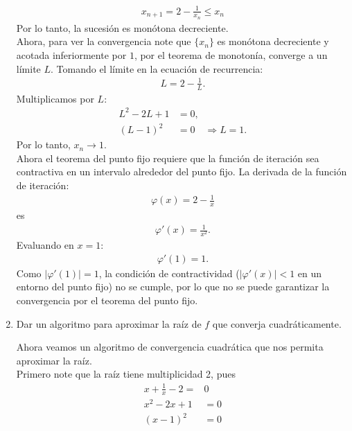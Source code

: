 \begin{homeworkProblem}
\begin{enumerate}
\begin{solucion}
        \begin{align*}
          x_{n+1}=2-\frac{1}{x_n}\leq x_n
        \end{align*}
        Por lo tanto, la sucesión es monótona decreciente.\\
        Ahora, para ver la convergencia note que $\{x_n\}$ es monótona decreciente y acotada inferiormente por $1$, por el teorema de monotonía, converge a un límite $L$. Tomando el límite en la ecuación de recurrencia:
        \begin{align*}
          L = 2 - \frac{1}{L}.
        \end{align*}
        Multiplicamos por $L$:
        \begin{align*}
          L^2 - 2L + 1 &= 0,\\
          (L - 1)^2 &= 0 \quad\Rightarrow L = 1.
        \end{align*}
        Por lo tanto, $x_n \to 1$.\\
        Ahora el teorema del punto fijo requiere que la función de iteración sea contractiva en un intervalo alrededor del punto fijo. La derivada de la función de iteración:
        \begin{align*}
          \varphi(x) = 2 - \frac{1}{x}
        \end{align*}
        es
        \begin{align*}
            \varphi'(x) = \frac{1}{x^2}.
        \end{align*}
        Evaluando en $x = 1$:
        \begin{align*}
          \varphi'(1) = 1.
        \end{align*}
        Como $|\varphi'(1)| = 1$, la condición de contractividad ($|\varphi'(x)| < 1 $ en un entorno del punto fijo) no se cumple, por lo que no se puede garantizar la convergencia por el teorema del punto fijo.
      \end{solucion}
    \item Dar un algoritmo para aproximar la raíz de $f$ que converja cuadráticamente.
      \begin{solucion}
        Ahora veamos un algoritmo de convergencia cuadrática que nos permita aproximar la raíz.\\
        Primero note que la raíz tiene multiplicidad 2, pues
        \begin{align*}
          x+\frac{1}{x}-2=&0\\
          x^2-2x+1&=0\\
          (x-1)^2&=0
        \end{align*}

\end{solucion}
\end{enumerate}
\end{homeworkProblem}
